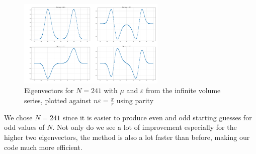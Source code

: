 \documentclass[11pt, letterpaper, onecolumn]{article}
\begin{document}
  	\begin{figure} [h] 
	\begin{center}
	\includegraphics[width=7cm]{"eigenvectors_Parity.png"}
	\caption{Eigenvectors for $N=241$ with $\mu$ and $\varepsilon$ from the infinite volume series, plotted against $n\varepsilon=\frac{x}{r}$ using parity}
	\end{center}
	\end{figure}
 	We chose $N=241$ since it is easier to produce even and odd starting guesses for odd values of $N$. Not only do we see a lot of improvement especially for the higher two eigenvectors, the method is also a lot faster than before, making our code much more efficient.











	


	

	
	
	
	


	
	
\end{document}
